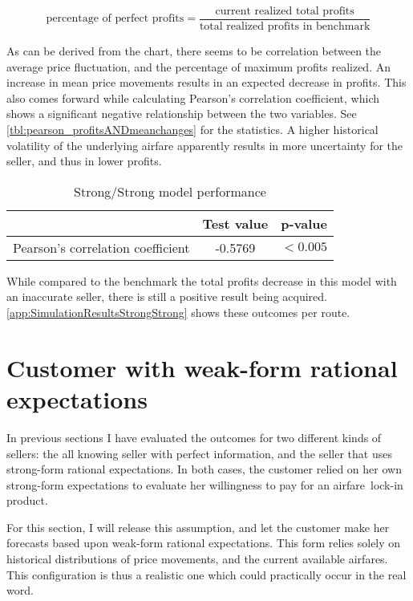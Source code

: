 
$$ \mbox{percentage of perfect profits} = \frac{\mbox{current realized total profits}}{\mbox{total realized profits in benchmark}} $$

As can be derived from the chart, there seems to be correlation between the average price fluctuation, and the percentage of maximum profits realized. An increase in mean price movements results in an expected decrease in profits. This also comes forward while calculating Pearson's correlation coefficient, which shows a significant negative relationship between the two variables. See \autoref{tbl:pearson_profitsANDmeanchanges} for the statistics. A higher historical volatility of the underlying airfare apparently results in more uncertainty for the seller, and thus in lower profits.

\begin{table}
\centering
\begin{tabular}{l c c}
\toprule
~  &  Test value  &  p-value  \\
\midrule
Pearson's correlation coefficient   &  -0.5769  &  $< 0.005$ \\
\bottomrule
\end{tabular}
\caption{Strong/Strong model performance}
\label{tbl:pearson_profitsANDmeanchanges}
\end{table}


While compared to the benchmark the total profits decrease in this model with an inaccurate seller, there is still a positive result being acquired. \autoref{app:SimulationResultsStrongStrong} shows these outcomes per route.


\section{Customer with weak-form rational expectations}
\label{sec:WeakCustomer}
In previous sections I have evaluated the outcomes for two different kinds of sellers: the all knowing seller with perfect information, and the seller that uses strong-form rational expectations. In both cases, the customer relied on her own strong-form expectations to evaluate her willingness to pay for an airfare~lock-in product.

For this section, I will release this assumption, and let the customer make her forecasts based upon weak-form rational expectations. This form relies solely on historical distributions of price movements, and the current available airfares. This configuration is thus a realistic one which could practically occur in the real word.


